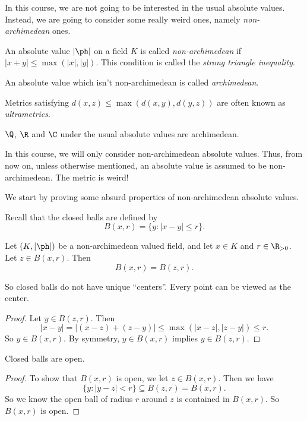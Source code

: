 \documentclass[a4paper]{article}
\begin{document}
In this course, we are not going to be interested in the usual absolute values. Instead, we are going to consider some really weird ones, namely \emph{non-archimedean} ones.
\begin{defi}
  An absolute value $|\ph|$ on a field $K$ is called \emph{non-archimedean} if $|x + y| \leq \max(|x|, |y|)$. This condition is called the \emph{strong triangle inequality}.

  An absolute value which isn't non-archimedean is called \emph{archimedean}.
\end{defi}
Metrics satisfying $d(x, z) \leq \max(d(x, y), d(y, z))$ are often known as \emph{ultrametrics}.

\begin{eg}
  $\Q$, $\R$ and $\C$ under the usual absolute values are archimedean.
\end{eg}

In this course, we will only consider non-archimedean absolute values. Thus, from now on, unless otherwise mentioned, an absolute value is assumed to be non-archimedean. The metric is weird!

We start by proving some absurd properties of non-archimedean absolute values.

Recall that the closed balls are defined by
\[
  B(x, r) = \{y: |x - y| \leq r\}.
\]
\begin{prop}
  Let $(K, |\ph|)$ be a non-archimedean valued field, and let $x \in K$ and $r \in \R_{> 0}$. Let $z \in B(x, r)$. Then
  \[
    B(x, r) = B(z, r).
  \]
\end{prop}
So closed balls do not have unique ``centers''. Every point can be viewed as the center.

\begin{proof}
  Let $y \in B(z, r)$. Then
  \[
    |x - y| = |(x - z) + (z - y)| \leq \max(|x - z|, |z - y|) \leq r.
  \]
  So $y \in B(x, r)$. By symmetry, $y \in B(x, r)$ implies $y \in B(z, r)$.
\end{proof}

\begin{cor}
  Closed balls are open.
\end{cor}

\begin{proof}
  To show that $B(x, r)$ is open, we let $z \in B(x, r)$. Then we have
  \[
    \{y: |y - z| < r\} \subseteq B(z, r) = B(x, r).
  \]
  So we know the open ball of radius $r$ around $z$ is contained in $B(x, r)$. So $B(x, r)$ is open.
\end{proof}
\end{document}
